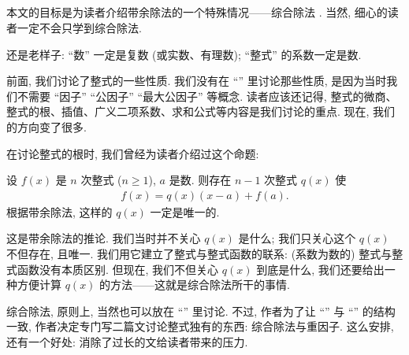 \subsection*{\SyntheticDivision}
\markright{\SyntheticDivision}

本文的目标是为读者介绍带余除法的一个特殊情况——综合除法 . 当然, 细心的读者一定不会只学到综合除法.

还是老样子: ``数'' 一定是复数 (或实数、有理数); ``整式'' 的系数一定是数.

前面, 我们讨论了整式的一些性质. 我们没有在 ``\HEADING '' 里讨论那些性质, 是因为当时我们不需要 ``因子'' ``公因子'' ``最大公因子'' 等概念. 读者应该还记得, 整式的微商、整式的根、插值、广义二项系数、求和公式等内容是我们讨论的重点. 现在, 我们的方向变了很多.

在讨论整式的根时, 我们曾经为读者介绍过这个命题:
\begin{proposition}
    设 $f(x)$ 是 $n$ 次整式 ($n \geq 1$), $a$ 是数. 则存在 $n-1$ 次整式 $q(x)$ 使
    \begin{align*}
        f(x) = q(x) (x-a) + f(a).
    \end{align*}
    根据带余除法, 这样的 $q(x)$ 一定是唯一的.
\end{proposition}

这是带余除法的推论. 我们当时并不关心 $q(x)$ 是什么; 我们只关心这个 $q(x)$ 不但存在, 且唯一. 我们用它建立了整式与整式函数的联系: (系数为数的) 整式与整式函数没有本质区别. 但现在, 我们不但关心 $q(x)$ 到底是什么, 我们还要给出一种方便计算 $q(x)$ 的方法——这就是综合除法所干的事情.

综合除法, 原则上, 当然也可以放在 ``\SomePropertiesOfPolynomials '' 里讨论. 不过, 作者为了让 ``\SomePropertiesOfIntegers '' 与 ``\SomePropertiesOfPolynomials '' 的结构一致, 作者决定专门写二篇文讨论整式独有的东西: 综合除法与重因子. 这么安排, 还有一个好处: 消除了过长的文给读者带来的压力.

